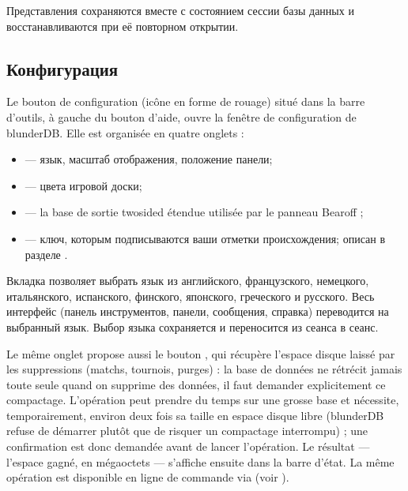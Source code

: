 \documentclass[letterpaper,10pt,russian]{sphinxmanual}
\begin{document}
\sphinxAtStartPar
Представления сохраняются вместе с состоянием сессии базы данных и восстанавливаются при её повторном открытии.


\subsection{Конфигурация}
\label{\detokenize{manuel:configuration}}\label{\detokenize{manuel:id2}}
\sphinxAtStartPar
Le bouton de configuration (icône en forme de rouage) situé dans la barre
d’outils, à gauche du bouton d’aide, ouvre la fenêtre de configuration de
blunderDB. Elle est organisée en quatre onglets :
\begin{itemize}
\item {} 
\sphinxAtStartPar
{} — язык, масштаб отображения, положение панели;

\item {} 
\sphinxAtStartPar
{} — цвета игровой доски;

\item {} 
\sphinxAtStartPar
{} — la base de sortie two\sphinxhyphen{}sided étendue utilisée par le panneau
Bearoff ;

\item {} 
\sphinxAtStartPar
{} — ключ, которым подписываются ваши отметки происхождения; описан в разделе {\hyperref[\detokenize{manuel:diffusion-controlee}]{}}.

\end{itemize}

\sphinxAtStartPar
Вкладка  позволяет выбрать язык из английского, французского, немецкого, итальянского, испанского, финского, японского, греческого и русского. Весь интерфейс (панель инструментов, панели, сообщения, справка) переводится на выбранный язык. Выбор языка сохраняется и переносится из сеанса в сеанс.

\sphinxAtStartPar
Le même onglet propose aussi le bouton , qui récupère
l’espace disque laissé par les suppressions (matchs, tournois, purges) : la
base de données ne rétrécit jamais toute seule quand on supprime des données,
il faut demander explicitement ce compactage. L’opération peut prendre du
temps sur une grosse base et nécessite, temporairement, environ deux fois sa
taille en espace disque libre (blunderDB refuse de démarrer plutôt que de
risquer un compactage interrompu) ; une confirmation est donc demandée avant
de lancer l’opération. Le résultat — l’espace gagné, en mégaoctets — s’affiche
ensuite dans la barre d’état. La même opération est disponible en ligne de
commande via  (voir {\hyperref[\detokenize{cli:cli}]{}}).
\end{document}
